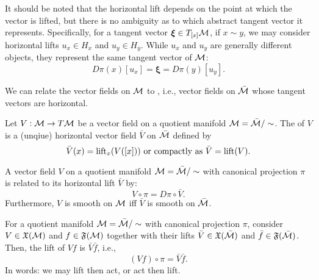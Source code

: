 \documentclass[11pt,a4paper]{article}
\begin{document}
\begin{remark}
It should be noted that the horizontal lift depends on the point at which the vector is lifted, but there is no ambiguity as to which abstract tangent vector it represents. Specifically, for a tangent vector $\boldsymbol\xi\in T_{[x]}\mathcal{M}$, if $x\sim y$, we may consider horizontal lifts $u_x\in H_x$ and $u_y\in H_y$. While $u_x$ and $u_y$ are generally different objects, they represent the same tangent vector of $\mathcal{M}$:
\begin{equation*}
    D\pi(x)[u_x] = \boldsymbol\xi = D\pi(y)[u_y].
\end{equation*}
\end{remark}

We can relate the vector fields on $\mathcal{M}$ to , i.e., vector fields on $\bar{\mathcal{M}}$ whose tangent vectors are horizontal.

\begin{definition}
Let $V:\mathcal{M}\rightarrow T\mathcal{M}$ be a vector field on a quotient manifold $\mathcal{M} = \bar{\mathcal{M}}/\sim$. The  of $V$ is a (unqiue) horizontal vector field $\bar{V}$ on $\bar{\mathcal{M}}$ defined by 
\begin{equation*}
\bar{V}(x) = \text{lift}_x(V([x]))\text{ or compactly as } \bar{V} = \text{lift}(V).
\end{equation*}
\end{definition}

\begin{proposition}
A vector field $V$ on a quotient manifold $\mathcal{M} = \bar{\mathcal{M}}/\sim$ with canonical projection $\pi$ is related to its horizontal lift $\bar{V}$ by:
\begin{equation*}
V\circ \pi = D\pi\circ \bar{V}.
\end{equation*}
Furthermore, $V$ is smooth on $\mathcal{M}$ iff $\bar{V}$ is smooth on $\bar{\mathcal{M}}$.
\end{proposition}

\begin{proposition}
For a quotient manifold $\mathcal{M} = \bar{\mathcal{M}}/\sim$ with canonical projection $\pi$, consider $V\in \mathfrak{X}(\mathcal{M})$ and $f\in\mathfrak{F}(\mathcal{M})$ together with their lifts $\bar{V}\in\mathfrak{X}(\bar{\mathcal{M}})$ and $\bar{f}\in\mathfrak{F}(\bar{\mathcal{M}})$. Then, the lift of $Vf$ is $\bar{V}\bar{f}$, i.e., 
\begin{equation*}
(Vf)\circ \pi = \bar{V}\bar{f}.
\end{equation*}
In words: we may lift then act, or act then lift.
\end{proposition}
\end{document}
